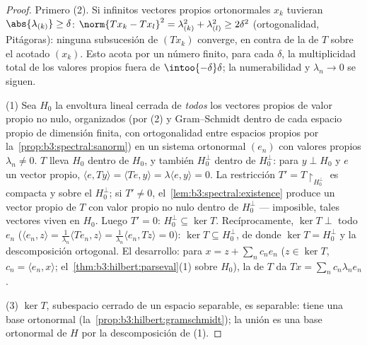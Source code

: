 \begin{proof}
Primero (2). Si infinitos vectores propios ortonormales $x_k$ tuvieran
$\abs{\lambda_{(k)}} \geq \delta$: $\norm{Tx_k - Tx_l}^2 =
\lambda_{(k)}^2 + \lambda_{(l)}^2 \geq 2\delta^2$ (ortogonalidad,
Pitágoras): ninguna subsucesión de $(Tx_k)$ converge, en contra de la
 de $T$ sobre el acotado $(x_k)$. Esto acota por un número
finito, para cada $\delta$, la multiplicidad total de los valores
propios fuera de $\intoo{-\delta}\delta$; la numerabilidad y
$\lambda_n \to 0$ se siguen.

(1) Sea $H_0$ la envoltura lineal cerrada de \emph{todos} los vectores
propios de valor propio no nulo, organizados (por (2) y Gram--Schmidt
dentro de cada espacio propio de dimensión finita, con ortogonalidad
entre espacios propios por la~\cref{prop:b3:spectral:sanorm}) en un
sistema ortonormal $(e_n)$ con valores propios $\lambda_n \neq 0$. $T$
lleva $H_0$ dentro de $H_0$, y también $H_0^\perp$ dentro de
$H_0^\perp$: para $y
\perp H_0$ y $e$ un vector propio, $\langle e, Ty\rangle =
\langle Te, y\rangle = \lambda\langle e, y\rangle = 0$. La restricción
$T' = T\restriction_{H_0^\perp}$ es
compacta y
 sobre el
 $H_0^\perp$; si
$T' \neq
0$, el~\cref{lem:b3:spectral:existence} produce un vector propio de $T$
con valor propio no nulo dentro de $H_0^\perp$ --- imposible, tales
vectores viven en $H_0$. Luego $T' = 0$: $H_0^\perp \subseteq \ker T$.
Recíprocamente, $\ker T \perp$ todo $e_n$
($\langle e_n, z\rangle = \frac1{\lambda_n}\langle
Te_n, z\rangle = \frac1{\lambda_n}\langle e_n, Tz\rangle =
0$): $\ker T \subseteq H_0^\perp$, de donde $\ker T =
H_0^\perp$ y la descomposición ortogonal. El desarrollo: para
$x = z + \sum_nc_ne_n$ ($z \in \ker T$, $c_n = \langle
e_n, x\rangle$; el~\cref{thm:b3:hilbert:parseval}(1) sobre $H_0$), la
 de $T$ da
$Tx = \sum_nc_n\lambda_ne_n$.

(3) $\ker T$, subespacio cerrado de un espacio separable, es separable:
tiene una base ortonormal (la~\cref{prop:b3:hilbert:gramschmidt}); la
unión es una base ortonormal de $H$ por la descomposición de (1).
\end{proof}

